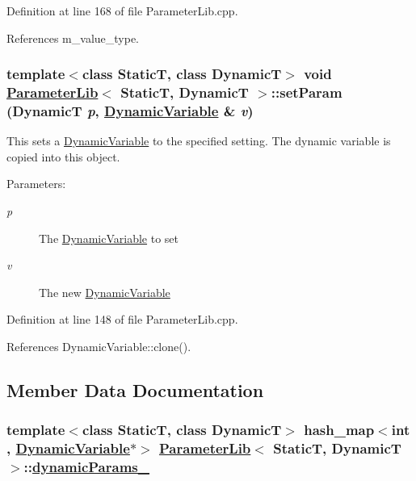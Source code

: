 Definition at line 168 of file Parameter\-Lib.cpp.

References m\_\-value\_\-type.\hypertarget{classParameterLib_a4}{
\subsubsection[setParam]{\setlength{\rightskip}{0pt plus 5cm}template$<$class Static\-T, class Dynamic\-T$>$ void \hyperlink{classParameterLib}{Parameter\-Lib}$<$ Static\-T, Dynamic\-T $>$::set\-Param (Dynamic\-T {\em p}, \hyperlink{classDynamicVariable}{Dynamic\-Variable} \& {\em v})}}
\label{classParameterLib_a4}


This sets a \hyperlink{classDynamicVariable}{Dynamic\-Variable} to the specified setting. The dynamic variable is copied into this object. \begin{Desc}
\item[Parameters:]
\begin{description}
\item[{\em p}]The \hyperlink{classDynamicVariable}{Dynamic\-Variable} to set \item[{\em v}]The new \hyperlink{classDynamicVariable}{Dynamic\-Variable} \end{description}
\end{Desc}


Definition at line 148 of file Parameter\-Lib.cpp.

References Dynamic\-Variable::clone().

\subsection{Member Data Documentation}
\hypertarget{classParameterLib_r1}{
\subsubsection[dynamicParams\_\-]{\setlength{\rightskip}{0pt plus 5cm}template$<$class Static\-T, class Dynamic\-T$>$ hash\_\-map$<$int , \hyperlink{classDynamicVariable}{Dynamic\-Variable}$\ast$$>$ \hyperlink{classParameterLib}{Parameter\-Lib}$<$ Static\-T, Dynamic\-T $>$::\hyperlink{classParameterLib_r1}{dynamic\-Params\_\-}}}
\label{classParameterLib_r1}


